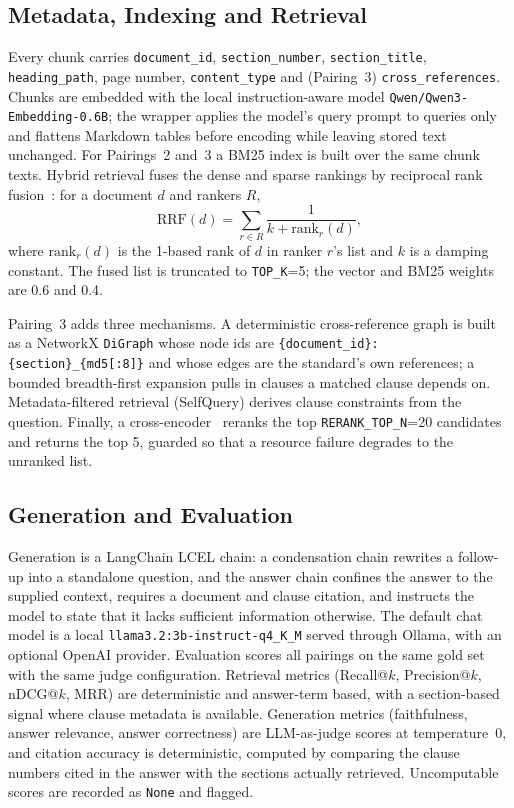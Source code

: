 \documentclass[conference]{IEEEtran}
\begin{document}
\subsection{Metadata, Indexing and Retrieval}
Every chunk carries \texttt{document\_id}, \texttt{section\_number}, \texttt{section\_title}, \texttt{heading\_path}, page number, \texttt{content\_type} and (Pairing~3) \texttt{cross\_references}. Chunks are embedded with the local instruction-aware model \texttt{Qwen/Qwen3-Embedding-0.6B}; the wrapper applies the model's query prompt to queries only and flattens Markdown tables before encoding while leaving stored text unchanged. For Pairings~2 and~3 a BM25 index is built over the same chunk texts. Hybrid retrieval fuses the dense and sparse rankings by reciprocal rank fusion~\cite{cormack2009}: for a document $d$ and rankers $R$,
\begin{equation}
\text{RRF}(d) = \sum_{r \in R} \frac{1}{k + \text{rank}_r(d)},
\end{equation}
where $\text{rank}_r(d)$ is the 1-based rank of $d$ in ranker $r$'s list and $k$ is a damping constant. The fused list is truncated to \texttt{TOP\_K}=5; the vector and BM25 weights are 0.6 and 0.4.

Pairing~3 adds three mechanisms. A deterministic cross-reference graph is built as a NetworkX \texttt{DiGraph} whose node ids are \texttt{\{document\_id\}:\{section\}\_\{md5[:8]\}} and whose edges are the standard's own references; a bounded breadth-first expansion pulls in clauses a matched clause depends on. Metadata-filtered retrieval (SelfQuery) derives clause constraints from the question. Finally, a cross-encoder~\cite{bge2024} reranks the top \texttt{RERANK\_TOP\_N}=20 candidates and returns the top 5, guarded so that a resource failure degrades to the unranked list.

\subsection{Generation and Evaluation}
Generation is a LangChain LCEL chain: a condensation chain rewrites a follow-up into a standalone question, and the answer chain confines the answer to the supplied context, requires a document and clause citation, and instructs the model to state that it lacks sufficient information otherwise. The default chat model is a local \texttt{llama3.2:3b-instruct-q4\_K\_M} served through Ollama, with an optional OpenAI provider. Evaluation scores all pairings on the same gold set with the same judge configuration. Retrieval metrics (Recall@$k$, Precision@$k$, nDCG@$k$, MRR) are deterministic and answer-term based, with a section-based signal where clause metadata is available. Generation metrics (faithfulness, answer relevance, answer correctness) are LLM-as-judge scores at temperature~0, and citation accuracy is deterministic, computed by comparing the clause numbers cited in the answer with the sections actually retrieved. Uncomputable scores are recorded as \texttt{None} and flagged.
\end{document}
